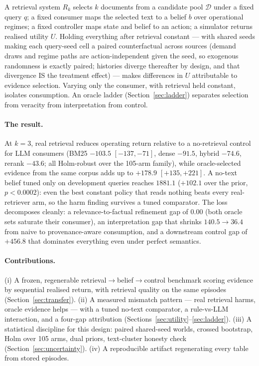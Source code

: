 \documentclass[runningheads]{llncs}
\begin{document}
A retrieval system $R_k$ selects $k$ documents from a candidate pool
$\mathcal{D}$ under a fixed query $q$; a fixed consumer maps the selected
text to a belief $b$ over operational regimes; a fixed controller maps state and
belief to an action; a simulator returns realised utility $U$. Holding
everything after retrieval constant --- with shared seeds making each
query-seed cell a paired counterfactual across sources (demand draws and
regime paths are action-independent given the seed, so exogenous randomness
is exactly paired; histories diverge thereafter by design, and that
divergence IS the treatment effect) --- makes differences
in $U$ attributable to
evidence selection. Varying only the consumer, with retrieval held constant,
isolates consumption. An oracle ladder (Section~\ref{sec:ladder}) separates
selection from veracity from interpretation from control.

\paragraph{The result.}
At $k=3$, real retrieval reduces operating return relative to a no-retrieval
control for LLM consumers (BM25 $-103.5$ $[-137,-71]$, dense $-91.5$,
hybrid $-74.6$, rerank $-43.6$; all Holm-robust over the 105-arm family),
while oracle-selected evidence from the same corpus adds up to $+178.9$
$[+135,+221]$. A no-text belief tuned only on development queries reaches
$1881.1$ ($+102.1$ over the prior, $p<0.0002$): even the best constant policy
that reads nothing beats every real-retriever arm, so the harm finding survives a
tuned comparator. The loss decomposes cleanly: a relevance-to-factual
refinement gap of $0.00$ (both oracle sets saturate their consumer), an
interpretation gap that shrinks $140.5 \to 36.4$ from naive to
provenance-aware consumption, and a downstream control gap of $+456.8$ that
dominates everything even under perfect semantics.

\paragraph{Contributions.}
(i) A frozen, regenerable retrieval$\to$belief$\to$control benchmark scoring
evidence by sequential realised return, with retrieval quality on the same
episodes (Section~\ref{sec:transfer}).
(ii) A measured mismatch pattern --- real retrieval harms, oracle evidence
helps --- with a tuned no-text comparator, a rule-vs-LLM interaction, and a
four-gap attribution (Sections~\ref{sec:utility}--\ref{sec:ladder}).
(iii) A statistical discipline for this design: paired shared-seed worlds,
crossed bootstrap, Holm over 105 arms, dual priors, text-cluster honesty
check (Section~\ref{sec:uncertainty}).
(iv) A reproducible artifact regenerating every table from stored episodes.
\end{document}
